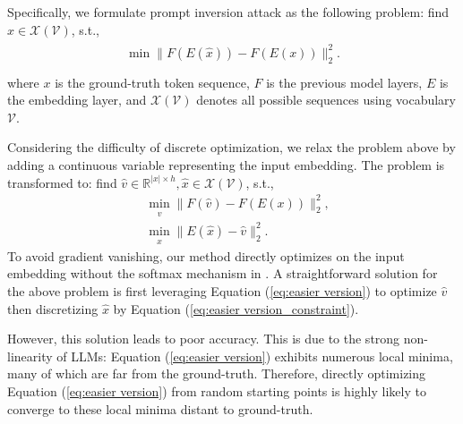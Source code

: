 Specifically, we formulate prompt inversion attack as the following problem: find $\hat{x}\in \mathcal{X}(\mathcal{V})$,  s.t.,
\begin{align}
\label{eq:first problem}
\begin{aligned}
     \min  \| F(E(\hat{x}))-F(E(x)) \|_2^2. \\ 
\end{aligned}
\end{align}
where $x$ is the ground-truth token sequence, $F$ is the previous model layers, $E$ is the embedding layer, and $\mathcal{X}(\mathcal{V})$ denotes all possible sequences using vocabulary $\mathcal{V}$.  

Considering the difficulty of discrete optimization, we relax the problem above by adding a continuous variable representing the input embedding. The problem is transformed to: find $\hat{v} \in \mathbb{R}^{|x|\times h}, \hat{x}\in \mathcal{X}(\mathcal{V})$,  s.t.,
\begin{align}
    & \min_{\hat{v}}  \| F(\hat{v})-F(E(x)) \|_2^2, \label{eq:easier version} \\ 
    & \min_{\hat{x}}  \| E(\hat{x})-\hat{v} \|_2^2  .\label{eq:easier version_constraint}
\end{align}
To avoid gradient vanishing, our method directly optimizes on the input embedding without the softmax mechanism in \cite{song2020information}. 
A straightforward solution for the above problem is  first leveraging Equation (\ref{eq:easier version})  to optimize $\hat{v}$ then discretizing $\hat{x}$ by Equation (\ref{eq:easier version_constraint}). 

However, this solution leads to poor accuracy. 
This is due to the strong non-linearity of LLMs:  Equation (\ref{eq:easier version}) exhibits numerous local minima, many of which are far from the ground-truth. Therefore, directly optimizing Equation (\ref{eq:easier version}) from random starting points is highly likely to converge to these  local minima distant to  ground-truth.

